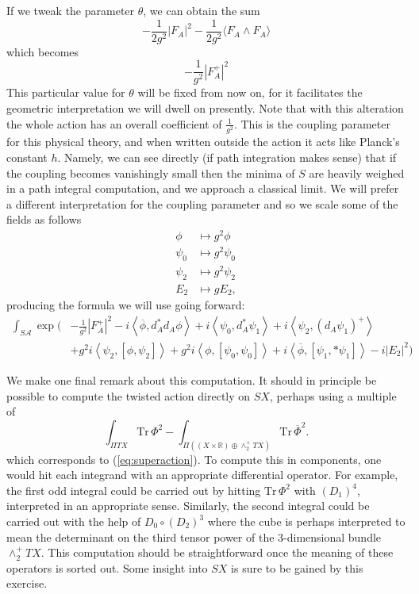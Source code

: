\documentclass[twoside]{amsart}
\newcommand{\RR}{\ensuremath{\mathbb{R}}}
\renewcommand{\eqref}[1]{(\ref{eq:#1})}
\newcommand{\enm}[1]{\ensuremath{#1}}
\renewcommand{\aa}{\enm{\mathcal{A}}}
\newcommand{\sa}{\enm{S\aa}}
\newcommand{\ip}[2]{\enm{\left<#1,#2\right>}}
\renewcommand{\bar}[1]{\overline{#1}}
\begin{document}
If we tweak the parameter \( \theta \), we can obtain the sum
\[ -\frac{1}{2g^{2}}|F_{A}|^{2} - \frac{1}{2g^{2}}\langle F_{A}\wedge F_{A}\rangle \]
which becomes
\[ -\frac{1}{g^{2}}|F_{A}^{+}|^{2} \]
This particular value for \( \theta \) will be fixed from now on, for
it facilitates the geometric interpretation we will dwell on
presently.  Note that with this alteration the whole action has an
overall coefficient of \( \frac{1}{g^{2}}.  \) This is the coupling
parameter for this physical theory, and when written outside the action
it acts like Planck's constant \( h \).  Namely, we can see directly
(if path integration makes sense) that if the coupling becomes
vanishingly small then the minima of \( S \) are heavily weighed in a
path integral computation, and we approach a classical limit.  We will
prefer a different interpretation for the coupling parameter and so we
scale some of the fields as follows
\begin{align*}
    \phi &\mapsto g^{2}\phi \\
    \psi_{0} &\mapsto   g^{2}\psi_{0}\\
    \psi_{2} &\mapsto   g^{2}\psi_{2} \\
    E_{2}    &\mapsto   gE_{2},
\end{align*}
producing the formula we will use going forward:
\begin{align}
    \label{eq:twistedaction}
        \int_{\sa}
      \exp \Big(
        &-\frac{1}{g^{2}}|F_{A}^{+}|^{2}
        - i\ip{\bar{\phi}}{d_{A}^{*}d_{A}\phi}
        +i\ip{\psi_{0}}{d_{A}^{*}\psi_{1}}
        + i\ip{\psi_{2}}{(d_{A}\psi_{1})^{+}} \\
        &+ g^{2}i\ip{\psi_{2}}{[\phi, \psi_{2}]}
        + g^{2}i\ip{\phi}{[\psi_{0},\psi_{0}]}
        + i\ip{\bar{\phi}}{[\psi_{1}, *\psi_{1}]}
        - i|E_{2}|^{2}\Big)
\end{align}

We make one final remark about this computation.  It should in
principle be possible to compute the twisted action directly on \( SX
\), perhaps using a multiple of
\[ \int_{\Pi TX}\mathrm{Tr}\, \Phi^{2} -
\int_{\Pi((X\times\RR)\oplus\wedge_{2}^{+}TX)}\mathrm{Tr}\,\bar{\Phi}^{2}.
\]
which corresponds to \eqref{superaction}.  To compute this in
components, one would hit each integrand with an appropriate
differential operator.  For example, the first odd integral could be
carried out by hitting \( \mathrm{Tr}\,\Phi^{2} \) with \( (D_{1})^{4}
\), interpreted in an appropriate sense.  Similarly, the second
integral could be carried out with the help of \( D_{0}\circ (D_{2})^{3}
\) where the cube is perhaps interpreted to mean the determinant on the
third tensor power of the 3-dimensional bundle \( \wedge_{2}^{+}TX.
\)  This computation should be straightforward once the meaning of
these operators is sorted out.  Some insight into \( SX \) is sure to
be gained by this exercise.
\end{document}
